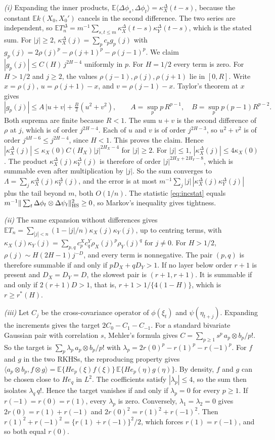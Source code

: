\documentclass[11pt]{article}
\theoremstyle{remark}
\newcommand{\E}{\mathbb E}
\begin{document}
\emph{(i)} Expanding the inner products, $\E\langle\Delta\phi_s,\Delta\phi_t\rangle=\kappa^\Delta_X(t-s)$, because the constant $\E k(X_0,X_0')$ cancels in the second difference. The two series are independent, so $\E T_n^\Delta=m^{-1}\sum_{s,t\le m}\kappa^\Delta_X(t-s)\kappa^\Delta_Y(t-s)$, which is the stated sum. For $|j|\ge2$, $\kappa^\Delta_X(j)=\sum_pc_pg_p(j)$ with $g_p(j)=2\rho(j)^p-\rho(j+1)^p-\rho(j-1)^p$. We claim $|g_p(j)|\le C(H)\,j^{2H-4}$ uniformly in $p$. For $H=1/2$ every term is zero. For $H>1/2$ and $j\ge2$, the values $\rho(j-1),\rho(j),\rho(j+1)$ lie in $[0,R]$. Write $x=\rho(j)$, $u=\rho(j+1)-x$, and $v=\rho(j-1)-x$. Taylor's theorem at $x$ gives
\[
|g_p(j)|\le A\,|u+v|+\tfrac B2(u^2+v^2),\qquad A=\sup_pp\,R^{p-1},\quad B=\sup_pp(p-1)R^{p-2}.
\]
Both suprema are finite because $R<1$. The sum $u+v$ is the second difference of $\rho$ at $j$, which is of order $j^{2H-4}$. Each of $u$ and $v$ is of order $j^{2H-3}$, so $u^2+v^2$ is of order $j^{4H-6}\le j^{2H-4}$, since $H<1$. This proves the claim. Hence $|\kappa^\Delta_X(j)|\le\kappa_X(0)C(H_X)|j|^{2H_X-4}$ for $|j|\ge2$. For $|j|\le1$, $|\kappa^\Delta_X(j)|\le4\kappa_X(0)$. The product $\kappa^\Delta_X(j)\kappa^\Delta_Y(j)$ is therefore of order $|j|^{2H_X+2H_Y-8}$, which is summable even after multiplication by $|j|$. So the sum converges to $\Lambda=\sum_j\kappa^\Delta_X(j)\kappa^\Delta_Y(j)$, and the error is at most $m^{-1}\sum_j|j|\,|\kappa^\Delta_X(j)\kappa^\Delta_Y(j)|$ plus the tail beyond $m$, both $O(1/n)$. The statistic \eqref{eq:incstat} equals $m^{-1}\|\sum_t\Delta\phi_t\otimes\Delta\psi_t\|^2_{\rm HS}\ge0$, so Markov's inequality gives tightness.

\emph{(ii)} The same expansion without differences gives $\E T_n=\sum_{|j|<n}(1-|j|/n)\kappa_X(j)\kappa_Y(j)$, up to centring terms, with $\kappa_X(j)\kappa_Y(j)=\sum_{p,q}c^X_pc^Y_q\rho_X(j)^p\rho_Y(j)^q$ for $j\ne0$. For $H>1/2$, $\rho(j)\sim H(2H-1)j^{-D}$, and every term is nonnegative. The pair $(p,q)$ is therefore summable if and only if $pD_X+qD_Y>1$. If no layer below order $r+1$ is present and $D_X=D_Y=D$, the slowest pair is $(r+1,r+1)$. It is summable if and only if $2(r+1)D>1$, that is, $r+1>1/\{4(1-H)\}$, which is $r\ge r^*(H)$.

\emph{(iii)} Let $C_j$ be the cross-covariance operator of $\phi(\xi_t)$ and $\psi(\eta_{t+j})$. Expanding the increments gives the target $2C_0-C_1-C_{-1}$. For a standard bivariate Gaussian pair with correlation $s$, Mehler's formula gives $C=\sum_{p\ge1}s^p\,a_p\otimes b_p/p!$. So the target is $\sum_p\lambda_p\,a_p\otimes b_p/p!$ with $\lambda_p=2r(0)^p-r(1)^p-r(-1)^p$. For $f$ and $g$ in the two RKHSs, the reproducing property gives $\langle a_p\otimes b_p,f\otimes g\rangle=\E\{He_p(\xi)f(\xi)\}\,\E\{He_p(\eta)g(\eta)\}$. By density, $f$ and $g$ can be chosen close to $He_q$ in $L^2$. The coefficients satisfy $|\lambda_p|\le4$, so the sum then isolates $\lambda_q\,q!$. Hence the target vanishes if and only if $\lambda_p=0$ for every $p\ge1$. If $r(-1)=r(0)=r(1)$, every $\lambda_p$ is zero. Conversely, $\lambda_1=\lambda_2=0$ gives $2r(0)=r(1)+r(-1)$ and $2r(0)^2=r(1)^2+r(-1)^2$. Then $r(1)^2+r(-1)^2=\{r(1)+r(-1)\}^2/2$, which forces $r(1)=r(-1)$, and so both equal $r(0)$.
\end{document}
